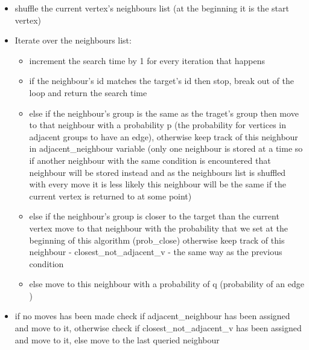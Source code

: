 \documentclass[11pt,a4paper,notitlepage]{article}
\begin{document}
\begin{itemize}
    \begin{itemize}
        \item shuffle the current vertex's neighbours list (at the beginning it is the start vertex)
        \item Iterate over the neighbours list:
        \begin{itemize}
            \item increment the search time by 1 for every iteration that happens
            \item if the neighbour's id matches the target's id then stop, break out of the loop and return the search time
            \item else if the neighbour's group is the same as the traget's group then move to that neighbour with a probability p (the probability for vertices in adjacent groups to have an edge), otherwise keep track of this neighbour in adjacent\_neighbour variable (only one neighbour is stored at a time so if another neighbour with the same condition is encountered that neighbour will be stored instead and as the neighbours list is shuffled with every move it is less likely this neighbour will be the same if the current vertex is returned to at some point)
            \item else if the neighbour's group is closer to the target than the current vertex move to that neighbour with the probability that we set at the beginning of this algorithm (prob\_close) otherwise keep track of this neighbour - closest\_not\_adjacent\_v - the same way as the previous condition
            \item else move to this neighbour with a probability of q (probability of an edge )
        \end{itemize}
        \item if no moves has been made check if adjacent\_neighbour has been assigned and move to it, otherwise check if closest\_not\_adjacent\_v has been assigned and move to it, else move to the last queried neighbour
    \end{itemize}
\end{itemize}
\end{document}
